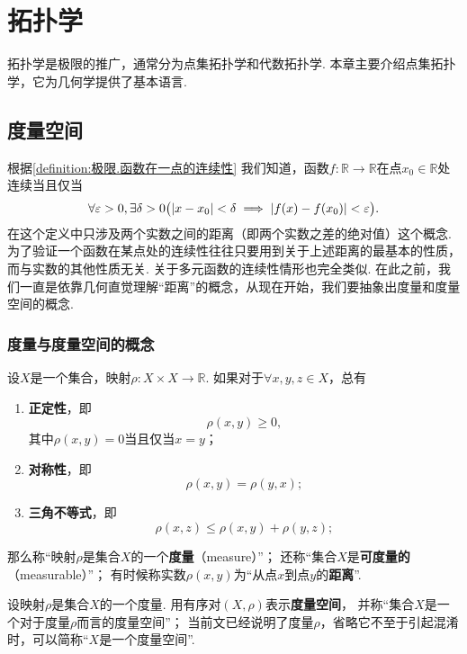 \chapter{拓扑学}
拓扑学是极限的推广，通常分为点集拓扑学和代数拓扑学.
本章主要介绍点集拓扑学，它为几何学提供了基本语言.

\section{度量空间}
根据\cref{definition:极限.函数在一点的连续性} 我们知道，函数\(f\colon\mathbb{R}\to\mathbb{R}\)在点\(x_0\in\mathbb{R}\)处连续当且仅当\[
\forall\varepsilon>0,
\exists\delta>0
\bigl(
\abs{x - x_0}<\delta
\implies
\abs{f(x) - f(x_0)} < \varepsilon
\bigr).
\]
在这个定义中只涉及两个实数之间的距离（即两个实数之差的绝对值）这个概念.
为了验证一个函数在某点处的连续性往往只要用到关于上述距离的最基本的性质，而与实数的其他性质无关.
关于多元函数的连续性情形也完全类似.
在此之前，我们一直是依靠几何直觉理解“距离”的概念，从现在开始，我们要抽象出度量和度量空间的概念.

\subsection{度量与度量空间的概念}
\begin{definition}
设\(X\)是一个集合，映射\(\rho\colon X \times X\to\mathbb{R}\).
如果对于\(\forall x,y,z \in X\)，总有\begin{enumerate}
\item \textbf{正定性}，即\[
\rho(x,y)\geqslant0,
\]其中\(\rho(x,y)=0\)当且仅当\(x=y\)；

\item \textbf{对称性}，即\[
\rho(x,y) = \rho(y,x);
\]

\item \textbf{三角不等式}，即\[
\rho(x,z) \leqslant \rho(x,y) + \rho(y,z);
\]
\end{enumerate}
那么称“映射\(\rho\)是集合\(X\)的一个\textbf{度量}（measure）”；
还称“集合\(X\)是\textbf{可度量的}（measurable）”；
有时候称实数\(\rho(x,y)\)为“从点\(x\)到点\(y\)的\textbf{距离}”.
\end{definition}

\begin{definition}
设映射\(\rho\)是集合\(X\)的一个度量.
用有序对\((X,\rho)\)表示\textbf{度量空间}，%
并称“集合\(X\)是一个对于度量\(\rho\)而言的度量空间”；
当前文已经说明了度量\(\rho\)，省略它不至于引起混淆时，可以简称“\(X\)是一个度量空间”.
\end{definition}

